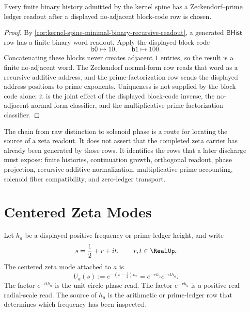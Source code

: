 \begin{theorem}
\label{thm:rh-finite-binary-histories-prime-ledger-readout}
Every finite binary history admitted by the kernel spine has a
Zeckendorf--prime ledger readout after a displayed no-adjacent block-code
row is chosen.
\end{theorem}

\begin{proof}
By \autoref{cor:kernel-spine-minimal-binary-recursive-readout}, a
generated $\mathsf{BHist}$ row has a finite binary word readout. Apply the
displayed block code
$$
\mathsf{b0}\mapsto 10,
\qquad
\mathsf{b1}\mapsto 100.
$$
Concatenating these blocks never creates adjacent $1$ entries, so the
result is a finite no-adjacent word. The Zeckendorf normal-form row reads
that word as a recursive additive address, and the prime-factorization
row sends the displayed address positions to prime exponents. Uniqueness
is not supplied by the block code alone; it is the joint effect of the
displayed block-code inverse, the no-adjacent normal-form classifier, and
the multiplicative prime-factorization classifier.
\end{proof}

\begin{principle}
\label{prin:rh-constructive-chain-proof-obligation-route}
The chain from raw distinction to solenoid phase is a route for locating
the source of a zeta readout. It does not assert that the completed zeta
carrier has already been generated by those rows. It identifies the rows
that a later discharge must expose: finite histories, continuation
growth, orthogonal readout, phase projection, recursive additive
normalization, multiplicative prime accounting, solenoid fiber
compatibility, and zero-ledger transport.
\end{principle}

\section{Centered Zeta Modes}
\label{sec:rh-centered-zeta-modes-phase-scale}

\begin{definition}
\label{def:rh-centered-phase-scale-mode}
Let $h_a$ be a displayed positive frequency or prime-ledger height, and
write
$$
s=\frac12+r+it,
\qquad
r,t\in\RealUp.
$$
The centered zeta mode attached to $a$ is
$$
U_a(s)
:=
e^{-(s-\frac12)h_a}
=
e^{-rh_a}e^{-ith_a}.
$$
The factor $e^{-ith_a}$ is the unit-circle phase read. The factor
$e^{-rh_a}$ is a positive real radial-scale read. The source of $h_a$ is
the arithmetic or prime-ledger row that determines which frequency has
been inspected.
\end{definition}

